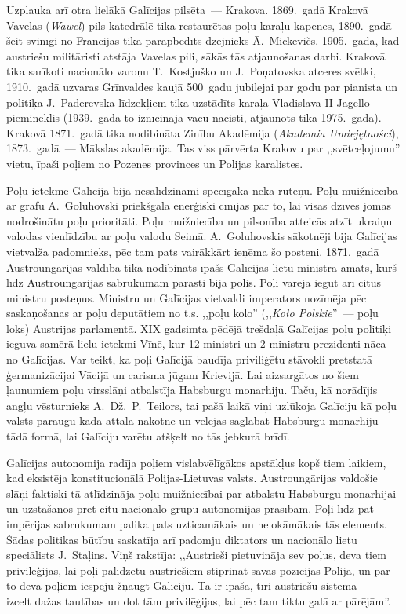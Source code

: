 \documentclass[twoside,a5paper,12pt,fleqn,openany]{extbook}
\newcommand{\pltxti}[1]{\textit{\textpolish{#1}}}
\begin{document}
Uzplauka arī otra lielākā Galīcijas pilsēta~--- Krakova. 1869.~gadā Krakovā Vavelas (\pltxti{Wawel}) pils katedrālē tika restaurētas poļu karaļu kapenes, 1890.~gadā šeit svinīgi no Francijas tika pārapbedīts dzejnieks Ā.~Mickēvičs. 1905.~gadā, kad austriešu militāristi atstāja Vavelas pili, sākās tās atjaunošanas darbi. Krakovā tika sarīkoti nacionālo varoņu T.~Kostjuško un J.~Poņatovska atceres svētki, 1910.~gadā uzvaras Grīnvaldes kaujā 500~gadu jubilejai par godu par pianista un politiķa J.~Paderevska līdzekļiem tika uzstādīts karaļa Vladislava II Jagello piemineklis (1939.~gadā to iznīcināja vācu nacisti, atjaunots tika 1975.~gadā). Krakovā 1871.~gadā tika nodibināta Zinību Akadēmija (\pltxti{Akademia Umiejętności}), 1873.~gadā~--- Mākslas akadēmija. Tas viss pārvērta Krakovu par ,,svētceļojumu'' vietu, īpaši poļiem no Pozenes provinces un Polijas karalistes.

Poļu ietekme Galīcijā bija nesalīdzināmi spēcīgāka nekā rutēņu. Poļu muižniecība ar grāfu A.~Goluhovski priekšgalā enerģiski cīnījās par to, lai visās dzīves jomās nodrošinātu poļu prioritāti. Poļu muižniecība un pilsonība atteicās atzīt ukraiņu valodas vienlīdzību ar poļu valodu Seimā. A.~Goluhovskis sākotnēji bija Galīcijas vietvalža padomnieks, pēc tam pats vairākkārt ieņēma šo posteni. 1871.~gadā Austroungārijas valdībā tika nodibināts īpašs Galīcijas lietu ministra amats, kurš līdz Austroungārijas sabrukumam parasti bija polis. Poļi varēja iegūt arī citus ministru posteņus. Ministru un Galīcijas vietvaldi imperators nozīmēja pēc saskaņošanas ar poļu deputātiem no t.s. ,,poļu kolo'' (,,\pltxti{Koło Polskie}''~--- poļu loks) Austrijas parlamentā. XIX gadsimta pēdējā trešdaļā Galīcijas poļu politiķi ieguva samērā lielu ietekmi Vīnē, kur 12 ministri un 2 ministru prezidenti nāca no Galīcijas. Var teikt, ka poļi Galīcijā baudīja priviliģētu stāvokli pretstatā ģermanizācijai Vācijā un carisma jūgam Krievijā. Lai aizsargātos no šiem ļaunumiem poļu virsslāņi atbalstīja Habsburgu monarhiju. Taču, kā norādījis angļu vēsturnieks A.~Dž.~P.~Teilors, tai pašā laikā viņi uzlūkoja Galīciju kā poļu valsts paraugu kādā attālā nākotnē un vēlējās saglabāt Habsburgu monarhiju tādā formā, lai Galīciju varētu atšķelt no tās jebkurā brīdī.

Galīcijas autonomija radīja poļiem vislabvēlīgākos apstākļus kopš tiem laikiem, kad eksistēja konstitucionālā Polijas-Lietuvas valsts. Austroungārijas valdošie slāņi faktiski tā atlīdzināja poļu muižniecībai par atbalstu Habsburgu monarhijai un uzstāšanos pret citu nacionālo grupu autonomijas prasībām. Poļi līdz pat impērijas sabrukumam palika pats uzticamākais un nelokāmākais tās elements. Šādas politikas būtību saskatīja arī padomju diktators un nacionālo lietu speciālists J.~Staļins. Viņš rakstīja: ,,Austrieši pietuvināja sev poļus, deva tiem privilēģijas, lai poļi palīdzētu austriešiem stiprināt savas pozīcijas Polijā, un par to deva poļiem iespēju žņaugt Galīciju. Tā ir īpaša, tīri austriešu sistēma~--- izcelt dažas tautības un dot tām privilēģijas, lai pēc tam tiktu galā ar pārējām''.
\end{document}

